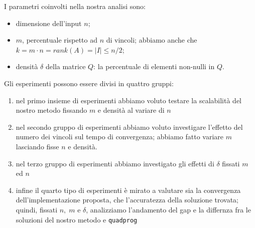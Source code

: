 I parametri coinvolti nella nostra analisi sono:
\begin{itemize}
    \item dimensione dell'input $n$;
    \item $m$, percentuale rispetto ad $n$ di vincoli; abbiamo anche che $k=m\cdot n = rank(A) = |I| \leq n/2$;
    \item densità $\delta$ della matrice $Q$: la percentuale di elementi non-nulli in $Q$.
\end{itemize}

Gli esperimenti possono essere divisi in quattro gruppi:
\begin{enumerate}
    \item nel primo insieme di esperimenti abbiamo voluto testare la scalabilità del nostro metodo fissando $m$ e densità al variare di $n$
    \item nel secondo gruppo di esperimenti abbiamo voluto investigare l'effetto del numero dei vincoli sul tempo di convergenza; abbiamo fatto variare $m$ lasciando fisse $n$ e densità.
    \item nel terzo gruppo di esperimenti abbiamo investigato gli effetti di $\delta$ fissati $m$ ed $n$
    \item infine il quarto tipo di esperimenti è mirato a valutare sia la convergenza dell'implementazione proposta, che l'accuratezza della soluzione trovata; quindi, fissati $n, \; m$ e $\delta$, analizziamo l'andamento del gap e la differnza fra le soluzioni del nostro metodo e \texttt{quadprog}
\end{enumerate}

